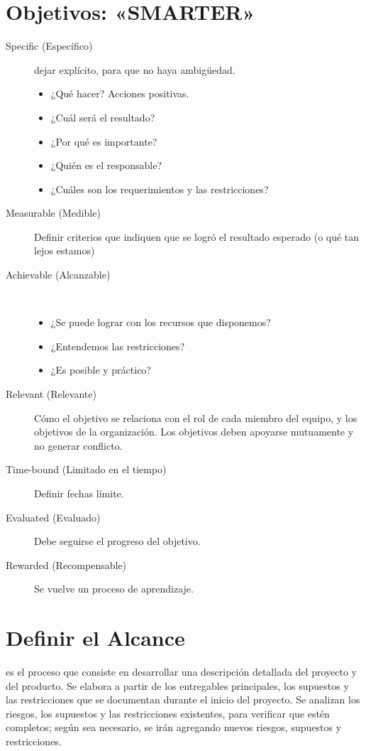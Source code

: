 \documentclass[portrait,a0paper,fontscale=0.277]{baposter}
\newcommand{\compresslist}{%
\setlength{\topsep}{0pt}%
\setlength{\itemsep}{0pt}%
\setlength{\parskip}{0pt}%
\setlength{\parsep}{0pt}%
}
\begin{document}
\begin{poster}
{\section*{Objetivos: «SMARTER»}
\begin{description}
	\item[Specific (Específico)] dejar explícito, para que no haya ambigüedad.
		\begin{itemize}\compresslist
			\item ¿Qué hacer? Acciones positivas.
			\item ¿Cuál será el resultado?
			\item ¿Por qué es importante?
			\item ¿Quién es el responsable?
			\item ¿Cuáles son los requerimientos y las restricciones?
		\end{itemize}
	\item[Measurable (Medible)]
	Definir criterios que indiquen que se logró el resultado esperado (o qué tan lejos estamos)
\item[Achievable (Alcanzable)]\hfill\\
	\begin{itemize}\compresslist
		\item ¿Se puede lograr con los recursos que disponemos?
		\item ¿Entendemos las restricciones?
		\item ¿Es posible y práctico?
	\end{itemize}
\item[Relevant (Relevante)]
	Cómo el objetivo se relaciona con el rol de cada miembro del equipo, y los objetivos de la organización.
	Los objetivos deben apoyarse mutuamente y no generar conflicto.
\item[Time-bound (Limitado en el tiempo)]
	Definir fechas límite.
\item[Evaluated (Evaluado)]
	Debe seguirse el progreso del objetivo.
\item[Rewarded (Recompensable)]
	Se vuelve un proceso de aprendizaje.
\end{description}
	
	
\section*{Definir el Alcance} es el proceso que consiste en desarrollar una descripción detallada del
proyecto y del producto. Se elabora a partir de los entregables principales, los supuestos y
las restricciones que se documentan durante el inicio del proyecto. Se analizan los riesgos, los
supuestos y las restricciones existentes, para verificar que estén completos; según sea necesario,
se irán agregando nuevos riesgos, supuestos y restricciones. 

}
\end{poster}
\end{document}
